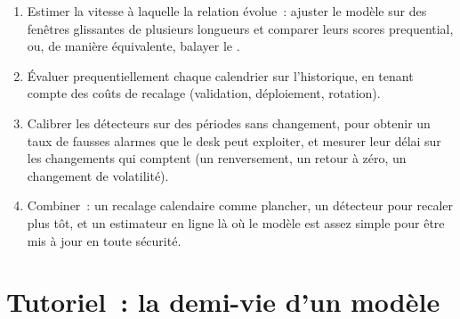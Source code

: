 \begin{method}\label{met:ml:online:method}
\begin{enumerate}
\item Estimer la vitesse à laquelle la relation évolue~: ajuster le modèle sur des fenêtres glissantes de plusieurs longueurs et comparer leurs
scores prequential, ou, de manière équivalente, balayer le .
\item Évaluer prequentiellement chaque calendrier sur l'historique, en tenant compte des coûts de recalage (validation, déploiement, rotation).
\item Calibrer les détecteurs sur des périodes sans changement, pour obtenir un taux de fausses alarmes que le desk peut exploiter, et mesurer
leur délai sur les changements qui comptent (un renversement, un retour à zéro, un changement de volatilité).
\item Combiner~: un recalage calendaire comme plancher, un détecteur pour recaler plus tôt, et un estimateur en ligne là où le modèle est
assez simple pour être mis à jour en toute sécurité.
\end{enumerate}
\end{method}

\section{Tutoriel~: la demi-vie d'un modèle}\label{tut:ml:online-learning-and-drift:tut}


